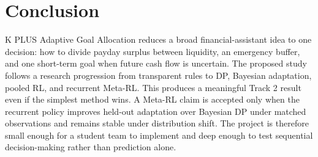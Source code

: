 \section{Conclusion}\label{sec:conclusion}

K PLUS Adaptive Goal Allocation reduces a broad financial-assistant idea to one decision: how to divide payday surplus between liquidity, an emergency buffer, and one short-term goal when future cash flow is uncertain. The proposed study follows a research progression from transparent rules to DP, Bayesian adaptation, pooled RL, and recurrent Meta-RL. This produces a meaningful Track 2 result even if the simplest method wins. A Meta-RL claim is accepted only when the recurrent policy improves held-out adaptation over Bayesian DP under matched observations and remains stable under distribution shift. The project is therefore small enough for a student team to implement and deep enough to test sequential decision-making rather than prediction alone.
